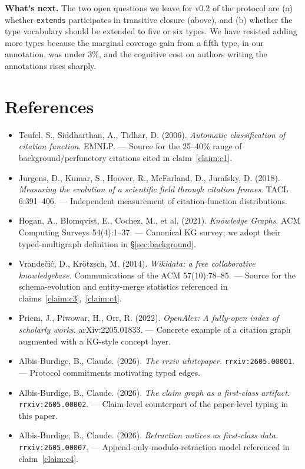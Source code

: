 \documentclass{rrxiv}
\begin{document}
\textbf{What's next.} The two open questions we leave for v0.2 of the protocol are (a) whether \texttt{extends} participates in transitive closure (above), and (b) whether the type vocabulary should be extended to five or six types. We have resisted adding more types because the marginal coverage gain from a fifth type, in our annotation, was under 3\%, and the cognitive cost on authors writing the annotations rises sharply.

\section{References}
\begin{itemize}[leftmargin=*]
\item Teufel, S., Siddharthan, A., Tidhar, D. (2006). \emph{Automatic classification of citation function}. EMNLP. --- Source for the 25--40\% range of background/perfunctory citations cited in claim~\ref{claim:c1}.\label{Teufel2006Function}
\item Jurgens, D., Kumar, S., Hoover, R., McFarland, D., Jurafsky, D. (2018). \emph{Measuring the evolution of a scientific field through citation frames}. TACL 6:391--406. --- Independent measurement of citation-function distributions.\label{Jurgens2018Measuring}
\item Hogan, A., Blomqvist, E., Cochez, M., et al. (2021). \emph{Knowledge Graphs}. ACM Computing Surveys 54(4):1--37. --- Canonical KG survey; we adopt their typed-multigraph definition in \S\ref{sec:background}.
\item Vrande{\v{c}}i\'{c}, D., Kr\"{o}tzsch, M. (2014). \emph{Wikidata: a free collaborative knowledgebase}. Communications of the ACM 57(10):78--85. --- Source for the schema-evolution and entity-merge statistics referenced in claims~\ref{claim:c3},~\ref{claim:c4}.
\item Priem, J., Piwowar, H., Orr, R. (2022). \emph{OpenAlex: A fully-open index of scholarly works}. arXiv:2205.01833. --- Concrete example of a citation graph augmented with a KG-style concept layer.
\item Albis-Burdige, B., Claude. (2026). \emph{The rrxiv whitepaper.} \texttt{rrxiv:2605.00001}. --- Protocol commitments motivating typed edges.
\item Albis-Burdige, B., Claude. (2026). \emph{The claim graph as a first-class artifact.} \texttt{rrxiv:2605.00002}. --- Claim-level counterpart of the paper-level typing in this paper.
\item Albis-Burdige, B., Claude. (2026). \emph{Retraction notices as first-class data.} \texttt{rrxiv:2605.00007}. --- Append-only-modulo-retraction model referenced in claim~\ref{claim:c4}.
\end{itemize}
\end{document}

